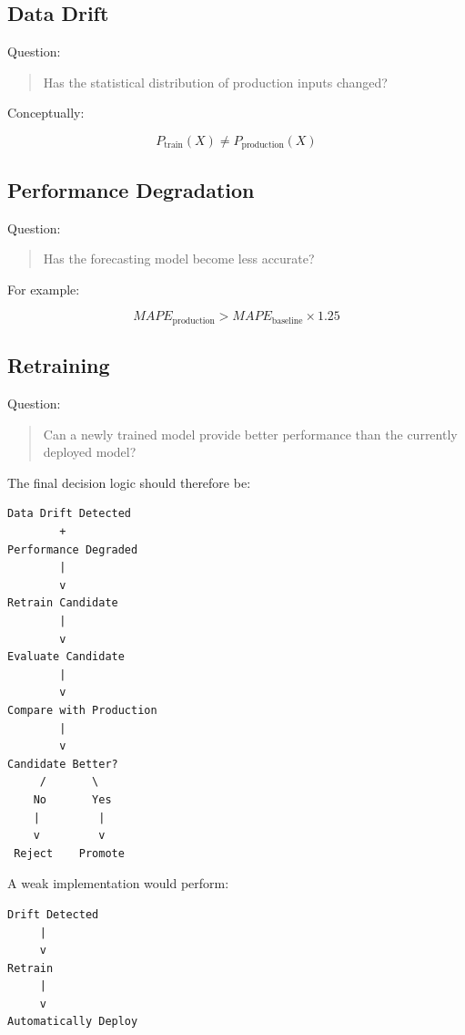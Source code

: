 \documentclass[11pt,a4paper]{article}
\begin{document}
\subsection{Data Drift}

Question:

\begin{quote}
Has the statistical distribution of production inputs changed?
\end{quote}

Conceptually:

\[
P_{\text{train}}(X)
\neq
P_{\text{production}}(X)
\]

\subsection{Performance Degradation}

Question:

\begin{quote}
Has the forecasting model become less accurate?
\end{quote}

For example:

\[
MAPE_{\text{production}}
>
MAPE_{\text{baseline}} \times 1.25
\]

\subsection{Retraining}

Question:

\begin{quote}
Can a newly trained model provide better performance than the currently deployed model?
\end{quote}

The final decision logic should therefore be:

\begin{verbatim}
Data Drift Detected
        +
Performance Degraded
        |
        v
Retrain Candidate
        |
        v
Evaluate Candidate
        |
        v
Compare with Production
        |
        v
Candidate Better?
     /       \
    No       Yes
    |         |
    v         v
 Reject    Promote
\end{verbatim}

A weak implementation would perform:

\begin{verbatim}
Drift Detected
     |
     v
Retrain
     |
     v
Automatically Deploy
\end{verbatim}
\end{document}

